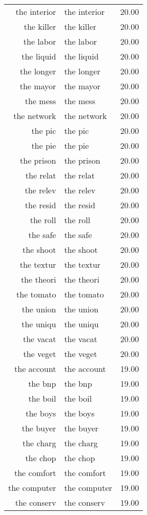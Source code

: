 \begin{table}[ht]
\begin{tabular}{rlr}
  the interior & the interior & 20.00 \\ 
  the killer & the killer & 20.00 \\ 
  the labor & the labor & 20.00 \\ 
  the liquid & the liquid & 20.00 \\ 
  the longer & the longer & 20.00 \\ 
  the mayor & the mayor & 20.00 \\ 
  the mess & the mess & 20.00 \\ 
  the network & the network & 20.00 \\ 
  the pic & the pic & 20.00 \\ 
  the pie & the pie & 20.00 \\ 
  the prison & the prison & 20.00 \\ 
  the relat & the relat & 20.00 \\ 
  the relev & the relev & 20.00 \\ 
  the resid & the resid & 20.00 \\ 
  the roll & the roll & 20.00 \\ 
  the safe & the safe & 20.00 \\ 
  the shoot & the shoot & 20.00 \\ 
  the textur & the textur & 20.00 \\ 
  the theori & the theori & 20.00 \\ 
  the tomato & the tomato & 20.00 \\ 
  the union & the union & 20.00 \\ 
  the uniqu & the uniqu & 20.00 \\ 
  the vacat & the vacat & 20.00 \\ 
  the veget & the veget & 20.00 \\ 
  the account & the account & 19.00 \\ 
  the bnp & the bnp & 19.00 \\ 
  the boil & the boil & 19.00 \\ 
  the boys & the boys & 19.00 \\ 
  the buyer & the buyer & 19.00 \\ 
  the charg & the charg & 19.00 \\ 
  the chop & the chop & 19.00 \\ 
  the comfort & the comfort & 19.00 \\ 
  the computer & the computer & 19.00 \\ 
  the conserv & the conserv & 19.00 \\ 

\end{tabular}
\end{table}
